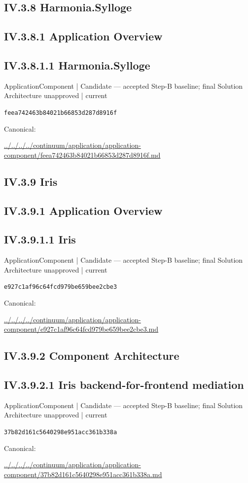 \documentclass[10pt,a4paper]{article}
\begin{document}
\subsection*{IV.3.8 Harmonia.Sylloge}
\subsection*{IV.3.8.1 Application Overview}
\subsection*{IV.3.8.1.1 Harmonia.Sylloge}
\label{element-feea742463b84021b66853d287d8916f}
{\small ApplicationComponent | Candidate — accepted Step-B baseline; final Solution Architecture unapproved | current}\par
\texttt{feea742463b84021b66853d287d8916f}\par
Canonical: \par
{\footnotesize\url{../../../../continuum/application/application-component/feea742463b84021b66853d287d8916f.md}}\par
\subsection*{IV.3.9 Iris}
\subsection*{IV.3.9.1 Application Overview}
\subsection*{IV.3.9.1.1 Iris}
\label{element-e927c1af96c64fcd979be659bee2cbe3}
{\small ApplicationComponent | Candidate — accepted Step-B baseline; final Solution Architecture unapproved | current}\par
\texttt{e927c1af96c64fcd979be659bee2cbe3}\par
Canonical: \par
{\footnotesize\url{../../../../continuum/application/application-component/e927c1af96c64fcd979be659bee2cbe3.md}}\par
\subsection*{IV.3.9.2 Component Architecture}
\subsection*{IV.3.9.2.1 Iris backend-for-frontend mediation}
\label{element-37b82d161c5640298e951acc361b338a}
{\small ApplicationComponent | Candidate — accepted Step-B baseline; final Solution Architecture unapproved | current}\par
\texttt{37b82d161c5640298e951acc361b338a}\par
Canonical: \par
{\footnotesize\url{../../../../continuum/application/application-component/37b82d161c5640298e951acc361b338a.md}}\par
\end{document}
